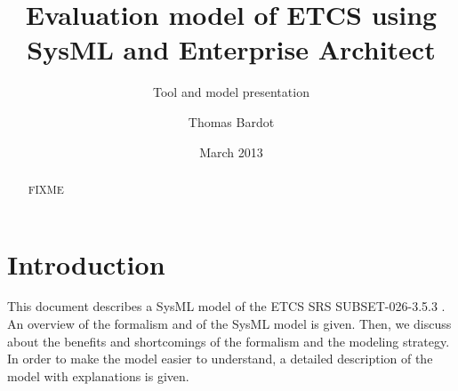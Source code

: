 \documentclass{template/openetcs_report}
\begin{document}
\frontmatter
{}




\title{Evaluation model of ETCS using SysML and Enterprise Architect}

\subtitle{Tool and model presentation}

\date{March 2013}

\author{Thomas Bardot}





\begin{abstract}
  FIXME
\end{abstract}

\maketitle
\tableofcontents
\listoffiguresandtables

\mainmatter



\chapter{Introduction}
This document describes a SysML model of the ETCS SRS SUBSET-026-3.5.3 \cite{SRS}. An overview of the formalism and of the SysML model is given. Then, we discuss about the benefits and shortcomings of the formalism and the modeling strategy. In order to make the model easier to understand, a detailed description of the model with explanations is given.
\end{document}
